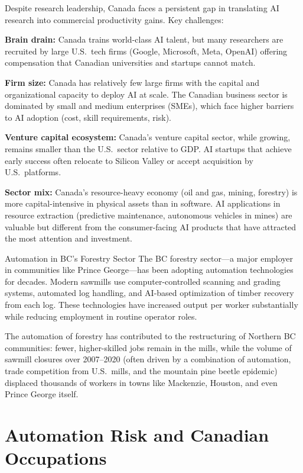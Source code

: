 Despite research leadership, Canada faces a persistent gap in translating AI research into commercial productivity gains. Key challenges:

\textbf{Brain drain:} Canada trains world-class AI talent, but many researchers are recruited by large U.S.\ tech firms (Google, Microsoft, Meta, OpenAI) offering compensation that Canadian universities and startups cannot match.

\textbf{Firm size:} Canada has relatively few large firms with the capital and organizational capacity to deploy AI at scale. The Canadian business sector is dominated by small and medium enterprises (SMEs), which face higher barriers to AI adoption (cost, skill requirements, risk).

\textbf{Venture capital ecosystem:} Canada's venture capital sector, while growing, remains smaller than the U.S.\ sector relative to GDP. AI startups that achieve early success often relocate to Silicon Valley or accept acquisition by U.S.\ platforms.

\textbf{Sector mix:} Canada's resource-heavy economy (oil and gas, mining, forestry) is more capital-intensive in physical assets than in software. AI applications in resource extraction (predictive maintenance, autonomous vehicles in mines) are valuable but different from the consumer-facing AI products that have attracted the most attention and investment.

\begin{canexample}{Automation in BC's Forestry Sector}
The BC forestry sector---a major employer in communities like Prince George---has been
adopting automation technologies for decades. Modern sawmills use computer-controlled
scanning and grading systems, automated log handling, and AI-based optimization of
timber recovery from each log. These technologies have increased output per worker
substantially while reducing employment in routine operator roles.

The automation of forestry has contributed to the restructuring of Northern BC communities:
fewer, higher-skilled jobs remain in the mills, while the volume of sawmill closures over
2007--2020 (often driven by a combination of automation, trade competition from U.S.\ mills,
and the mountain pine beetle epidemic) displaced thousands of workers in towns like
Mackenzie, Houston, and even Prince George itself.
\end{canexample}

\section{Automation Risk and Canadian Occupations}

